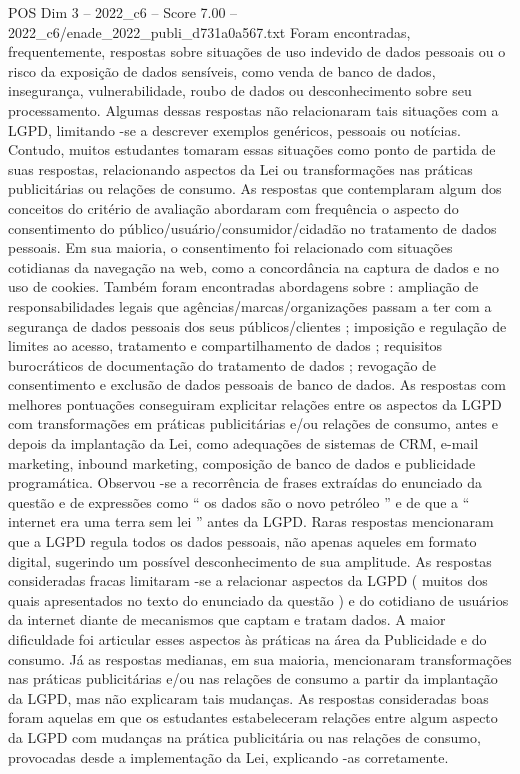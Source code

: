 \begin{textsample}{POS Dim 3 – 2022\_c6 – Score 7.00 – 2022\_c6/enade\_2022\_publi\_d731a0a567.txt}
Foram encontradas, frequentemente, respostas sobre situações de uso indevido de dados pessoais ou o risco da exposição de dados sensíveis, como venda de banco de dados, insegurança, vulnerabilidade, roubo de dados ou desconhecimento sobre seu processamento.
Algumas dessas respostas não relacionaram tais situações com a LGPD, limitando -se a descrever exemplos genéricos, pessoais ou notícias.
Contudo, muitos estudantes tomaram essas situações como ponto de partida de suas respostas, relacionando aspectos da Lei ou transformações nas práticas publicitárias ou relações de consumo.
As respostas que contemplaram algum dos conceitos do critério de avaliação abordaram com frequência o aspecto do consentimento do público/usuário/consumidor/cidadão no tratamento de dados pessoais.
Em sua maioria, o consentimento foi relacionado com situações cotidianas da navegação na web, como a concordância na captura de dados e no uso de cookies.
Também foram encontradas abordagens sobre : ampliação de responsabilidades legais que agências/marcas/organizações passam a ter com a segurança de dados pessoais dos seus públicos/clientes ; imposição e regulação de limites ao acesso, tratamento e compartilhamento de dados ; requisitos burocráticos de documentação do tratamento de dados ; revogação de consentimento e exclusão de dados pessoais de banco de dados.
As respostas com melhores pontuações conseguiram explicitar relações entre os aspectos da LGPD com transformações em práticas publicitárias e/ou relações de consumo, antes e depois da implantação da Lei, como adequações de sistemas de CRM, e-mail marketing, inbound marketing, composição de banco de dados e publicidade programática.
Observou -se a recorrência de frases extraídas do enunciado da questão e de expressões como “ os dados são o novo petróleo ” e de que a “ internet era uma terra sem lei ” antes da LGPD.
Raras respostas mencionaram que a LGPD regula todos os dados pessoais, não apenas aqueles em formato digital, sugerindo um possível desconhecimento de sua amplitude.
As respostas consideradas fracas limitaram -se a relacionar aspectos da LGPD ( muitos dos quais apresentados no texto do enunciado da questão ) e do cotidiano de usuários da internet diante de mecanismos que captam e tratam dados.
A maior dificuldade foi articular esses aspectos às práticas na área da Publicidade e do consumo.
Já as respostas medianas, em sua maioria, mencionaram transformações nas práticas publicitárias e/ou nas relações de consumo a partir da implantação da LGPD, mas não explicaram tais mudanças.
As respostas consideradas boas foram aquelas em que os estudantes estabeleceram relações entre algum aspecto da LGPD com mudanças na prática publicitária ou nas relações de consumo, provocadas desde a implementação da Lei, explicando -as corretamente.

\end{textsample}
